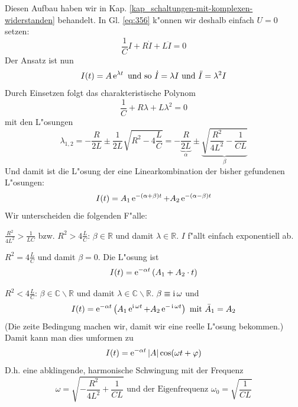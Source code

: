 Diesen Aufbau haben wir in
Kap. \ref{kap_schaltungen-mit-komplexen-widerstanden} behandelt. In
Gl. \eqref{eq:356} k"onnen wir deshalb einfach $U = 0$ setzen:
\begin{equation}
   \label{eq:369}
   \frac{1}{C}I + R \dot I + L\ddot I = 0
\end{equation}
Der Ansatz ist nun
\begin{equation*}
   I(t) = A \operatorname{e}^{\lambda t} \text{ und so } \dot I = \lambda I \text{
     und } \ddot I = \lambda^2 I
\end{equation*}
Durch Einsetzen folgt das charakteristische Polynom
\begin{equation}
   \label{eq:370}
     \frac{1}{C} + R \lambda + L \lambda^2 = 0
\end{equation}
mit den L"osungen
\begin{equation}
   \label{eq:371}
   \lambda_{1,2} = -\frac{R}{2L} \pm \frac{1}{2L}\sqrt{R^2 -
     4\frac{L}{C}}
=
-\underbrace{\frac{R}{2L}}_\alpha \pm \underbrace{\sqrt{\frac{R^2}{4L^2} -
     \frac{1}{CL}}}_\beta
\end{equation}
Und damit ist die L"osung der eine Linearkombination der bisher
gefundenen L"osungen:
\begin{equation}
   \label{eq:372}
   I(t) = A_1 \operatorname{e}^{-(\alpha + \beta)t} + A_2 \operatorname{e}^{-(\alpha - \beta)t}
\end{equation}
Wir unterscheiden die folgenden F"alle:
\begin{description}[\setlabelstyle{\bfseries\slshape}]
\item[\index{Kriechfall}Kriechfall] $\frac{R^2}{4L^2} > \frac{1}{LC}$ bzw. $R^2 > 4{\frac{L}{C}}$: $\beta \in
   \mathbb R$ und damit $\lambda \in \mathbb R$. $I$ f"allt einfach
   exponentiell ab.
\item[\index{Aperiodischer Grenzfall}Aperiodischer Grenzfall]  $R^2 = 4\frac{L}{C}$ und
   damit $\beta = 0$. Die L"osung ist
   \begin{equation}
\label{eq:374}
      I(t) = \operatorname{e}^{-\alpha t} \left (A_1 + A_2 \cdot t \right )
   \end{equation}
\item[\index{Ged"ampfte Schwingung}Ged"ampfte Schwingung] $R^2 < 4\frac{L}{C}$: $\beta \in \mathbb
   C\backslash \mathbb R$ und damit $\lambda \in \mathbb C\backslash
   \mathbb R$. $\beta \equiv \operatorname{i} \omega$ und
   \begin{equation*}
      I (t) = \operatorname{e}^{-\alpha t} \left ( A_1 \operatorname{e}^{\operatorname{i} \omega t} + A_2 \operatorname{e}^{-\operatorname{i}
         \omega t} \right ) \text{ mit } \bar A_1 = A_2
   \end{equation*}
   (Die zeite Bedingung machen wir, damit wir eine reelle L"osung
   bekommen.) Damit kann man dies umformen zu
  \begin{equation}
     \label{eq:373}
     I(t) = \operatorname{e}^{-\alpha t} |A| \cos (\omega t + \varphi)
  \end{equation}
D.h. eine abklingende, harmonische Schwingung mit der Frequenz
\begin{equation}
   \label{eq:375}
   \omega = \sqrt{- \frac{R^2}{4L^2} +
     \frac{1}{CL}} \text{ und der Eigenfrequenz } \omega_0 = \sqrt{\frac{1}{CL}}
\end{equation}
\end{description}

